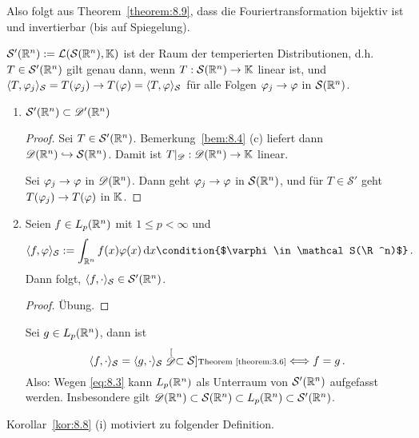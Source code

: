 \begin{bem*}
Also folgt aus Theorem~\ref{theorem:8.9}, dass die Fouriertransformation bijektiv ist und invertierbar (bis auf Spiegelung).
\end{bem*}

\begin{defi}
  $\mathcal S'(\mathbb{R}^n):=\mathcal{L}(\mathcal S(\mathbb{R}^n),\mathbb{K})$ ist der Raum der temperierten Distributionen, d.h.\ $T\in \mathcal S'(\mathbb{R}^n)$ gilt genau dann, wenn $T:\mathcal S(\mathbb{R}^n)\rightarrow\mathbb{K}$ linear ist, und $\langle T,\varphi_j\rangle_{\mathcal S}=T(\varphi_j)\rightarrow T(\varphi)=\langle T,\varphi\rangle_{\mathcal S}$ für alle Folgen $\varphi_j\rightarrow\varphi$ in $\mathcal S(\mathbb{R}^n)$.
\end{defi}

\begin{bem}
  \label{bem:8.10}
  \begin{enumerate}[\rm(a)]
  \item $\mathcal S'(\mathbb{R}^n)\subset\mathscr{D}'(\mathbb{R}^n)$
    \begin{proof}
      Sei $T\in \mathcal S'(\mathbb{R}^n)$. Bemerkung~\ref{bem:8.4} (c) liefert dann $\mathscr{D}(\mathbb{R}^n)\hookrightarrow \mathcal S(\mathbb{R}^n)$. Damit ist $T\rvert_{\mathscr{D}}:\mathscr{D}(\mathbb{R}^n)\rightarrow\mathbb{K}$ linear.

      Sei $\varphi_j\rightarrow\varphi$ in $\mathscr{D}(\mathbb{R}^n)$. Dann geht $\varphi_j\rightarrow\varphi$ in $\mathcal S(\mathbb{R}^n)$, und für $T\in \mathcal S'$ geht $T(\varphi_j)\rightarrow T(\varphi)$ in $\mathbb{K}$.
    \end{proof}

  \item Seien $f\in L_p(\mathbb{R}^n)$ mit $1\leq p<\infty$ und 
    \begin{align}
      \label{eq:8.3}
      \<f,\varphi\>_{\mathcal S}:=\int_{\R^n}f(x)\varphi(x)\d x
      \condition{$\varphi\in \mathcal S(\R^n)$}\, .
    \end{align}
    Dann folgt, $\langle f, \cdot \rangle_{\mathcal S} \in \mathcal S' (\mathbb{R}^n)$. 
    \begin{proof}
    Übung.
    \end{proof}
    Sei $g \in L_p(\mathbb{R}^n)$, dann ist
    \[
    	\langle f, \cdot \rangle_{\mathcal S} = \langle g, \cdot \rangle_{\mathcal S} \stackrel[{\mathscr{D}} \subset \mathcal S]{\scriptsize\text{Theorem}~\ref{theorem:3.6}}\Longleftrightarrow f=g \, .
    \]
    Also: Wegen \eqref{eq:8.3} kann $L_p(\mathbb{R}^n)$ als Unterraum von $\mathcal S'(\mathbb{R}^n)$ aufgefasst werden. Insbesondere gilt $\mathscr{D}(\mathbb{R}^n) \subset \mathcal S(\mathbb{R}^n) \subset L_p(\mathbb{R}^n) \subset \mathcal S'(\mathbb{R}^n)$.
  \end{enumerate}
\end{bem}
Korollar~\ref{kor:8.8} (i) motiviert zu folgender Definition.


